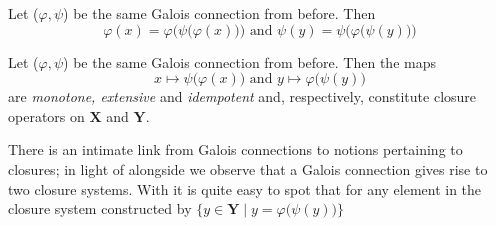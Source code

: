 \begin{proposition}
  \label{proposition:galois-idem} Let ($\varphi, \psi$) be the same Galois connection from before. Then
  \[
    \varphi (x) = \varphi \Big( \psi \big( \varphi (x)\big) \Big) \text{ and }\psi (y) = \psi \Big( \varphi \big( \psi (y)\big) \Big)
  \]
\end{proposition}

\begin{proposition}
  \label{proposition:galois-connections-closure-operators} Let ($\varphi, \psi$) be the same Galois connection from before. Then the maps
  \[
    x \mapsto \psi \big(\varphi(x)\big) \text{ and }y \mapsto \varphi \big(\psi (y)\big)
  \]
  are \textit{monotone, extensive} and \textit{idempotent} and, respectively, constitute closure operators on $\mathbf{X}$ and $\mathbf{Y}$.
\end{proposition}

There is an intimate link from Galois connections to notions pertaining to closures; in light of  alongside
 we observe that a Galois connection gives rise to two closure systems. With  it is quite easy to spot that for any element in the closure
system constructed by $\{y \in \mathbf{Y}\mid y = \varphi \big(\psi(y)\big)\}$

